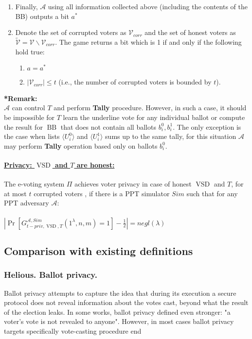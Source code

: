 \documentclass[12pt]{article}
\DeclareMathOperator{\vsd}{VSD}
\DeclareMathOperator{\bb}{BB}
\begin{document}
\begin{enumerate}
\item Finally, $\mathcal{A}$ using all information collected above (including the contents of the BB) outputs a bit $a^*$
\item Denote the set of corrupted voters as $\mathcal{V}_{corr}$ and the set of honest voters as $\tilde{\mathcal{V}}= \mathcal{V} \backslash \mathcal{V}_{corr}$. The game returns a bit which is 1 if and only if the following hold true:
\begin{enumerate}
 \item $a = a^*$
 \item $|\mathcal{V}_{corr}| \leq t$ (i.e., the number of corrupted voters is bounded by $t$).
\end{enumerate}
\end{enumerate}
\textbf{*Remark:}\\
$\mathcal{A}$ can control $T$ and perform \textbf{Tally} procedure. However, in such a case, it should be impossible for $T$ learn the underline vote for any individual ballot or compute the result for $\bb$ that does not contain all ballots $b_i^0,b_i^1$. The only exception is the case when lists $\langle U^0_i \rangle$ and $\langle U^1_i \rangle$ sums up to the same tally, for this situation $\mathcal{A}$ may perform \textbf{Tally} operation based only on ballots $b_i^0$. \\\\
\underline{\textbf{Privacy: $\vsd$ and $T$ are honest:}}\\\\
The e-voting system $\Pi$ achieves voter privacy in case of honest $\vsd$ and $T$, for at most $t$ corrupted voters , if there is a PPT simulator $Sim$ such that for any PPT adversary $\mathcal{A}$:\\\\
 $|\Pr[G_{t-priv,\vsd,T}^{\mathcal{A},Sim}(1^{\lambda},n,m) = 1] - \frac{1}{2}| = negl(\lambda)$
 \subsection{Comparison with existing definitions}
 \subsubsection{Helious. Ballot privacy.}
 Ballot privacy attempts to capture the idea that during its execution a secure protocol does not reveal information about the votes cast, beyond what the result of the election leaks. In some works, ballot privacy defined even stronger: "a voter's vote is not revealed to anyone". However, in most cases ballot privacy targets specifically vote-casting procedure end \\ 
  
\end{document}
